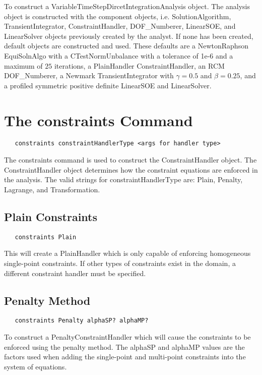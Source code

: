 \documentclass[12pt]{article}
\begin{document}
To construct a VariableTimeStepDircetIntegrationAnalysis object. The
analysis object is constructed with the component objects,
i.e. SolutionAlgorithm, TransientIntegrator, ConstraintHandler,
DOF\_Numberer, LinearSOE, and LinearSolver objects previously created
by the analyst. If none has been created, default objects are
constructed and used. These defaults are a NewtonRaphson EquiSolnAlgo
with a CTestNormUnbalance with a tolerance of 1e-6 and a maximum
of $25$ iterations, a PlainHandler ConstraintHandler, an RCM
DOF\_Numberer, a Newmark TransientIntegrator with $\gamma = 0.5$ and
$\beta = 0.25$, and a profiled symmetric positive definite LinearSOE
and LinearSolver. 


\section {The constraints Command}
{\sf\small
\begin{verbatim}
   constraints constraintHandlerType <args for handler type>
\end{verbatim}
}

The constraints command is used to construct the ConstraintHandler
object. The ConstraintHandler object determines how the constraint
equations are enforced in the analysis. The valid strings for
constraintHandlerType are: Plain, Penalty, Lagrange, and Transformation.

\subsection{Plain Constraints}

{\sf\small
\begin{verbatim}
   constraints Plain
\end{verbatim}
}

\noindent This will create a PlainHandler which is only capable of enforcing
homogeneous single-point constraints. If other types of constraints
exist in the domain, a different constraint handler must be specified.

\subsection{Penalty Method}

{\sf\small
\begin{verbatim}
   constraints Penalty alphaSP? alphaMP?
\end{verbatim}
}

\noindent To construct a PenaltyConstraintHandler which will cause the
constraints to be enforced using the penalty method. The alphaSP and
alphaMP values are the factors used when adding the single-point and
multi-point constraints into the system of equations.
\end{document}
